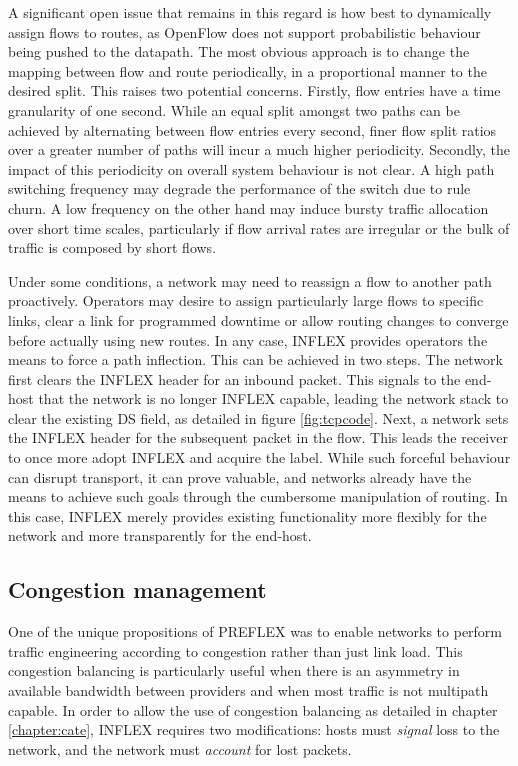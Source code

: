 A significant open issue that remains in this regard is how best to dynamically assign flows to routes, as OpenFlow does not support probabilistic behaviour being pushed to the datapath.
The most obvious approach is to change the mapping between flow and route periodically, in a proportional manner to the desired split.
This raises two potential concerns.
Firstly, flow entries have a time granularity of one second.
While an equal split amongst two paths can be achieved by alternating between flow entries every second, finer flow split ratios over a greater number of paths will incur a much higher periodicity.
Secondly, the impact of this periodicity on overall system behaviour is not clear.
A high path switching frequency may degrade the performance of the switch due to rule churn.
A low frequency on the other hand may induce bursty traffic allocation over short time scales, particularly if flow arrival rates are irregular or the bulk of traffic is composed by short flows.

Under some conditions, a network may need to reassign a flow to another path proactively.
Operators may desire to assign particularly large flows to specific links, clear a link for programmed downtime or allow routing changes to converge before actually using new routes.
In any case, INFLEX provides operators the means to force a path inflection.
This can be achieved in two steps.
The network first clears the INFLEX header for an inbound packet. 
This signals to the end-host that the network is no longer INFLEX capable, leading the network stack to clear the existing \ac{DS} field, as detailed in figure \ref{fig:tcpcode}.
Next, a network sets the INFLEX header for the subsequent packet in the flow.
This leads the receiver to once more adopt INFLEX and acquire the label.
While such forceful behaviour can disrupt transport, it can prove valuable, and networks already have the means to achieve such goals through the cumbersome manipulation of routing.
In this case, INFLEX merely provides existing functionality more flexibly for the network and more transparently for the end-host.

\subsection{Congestion management}

One of the unique propositions of \ac{PREFLEX} was to enable networks to perform traffic engineering according to congestion rather than just link load.
This congestion balancing is particularly useful when there is an asymmetry in available bandwidth between providers and when most traffic is not multipath capable.
In order to allow the use of congestion balancing as detailed in chapter \ref{chapter:cate}, INFLEX requires two modifications: hosts must \emph{signal} loss to the network, and the network must \emph{account} for lost packets.

